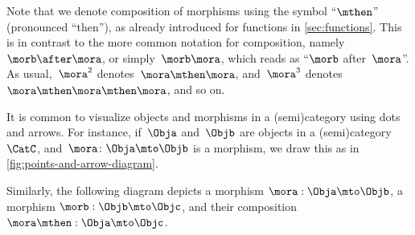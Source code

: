 \begin{remark}
	Note that we denote composition of morphisms using the symbol ``$\mthen$'' (pronounced ``then''), as already introduced for functions in \cref{sec:functions}.
	This is in contrast to the more common notation for composition, namely~$\morb\after \mora$, or simply~$\morb \mora$, which reads as ``$\morb$ after~$\mora$''.
	As usual,~$\mora^2$ denotes~$\mora \mthen \mora$, and~$\mora^3$ denotes~$\mora \mthen \mora \mthen \mora$, and so on.
\end{remark}

\begin{remark}
	It is common to visualize objects and morphisms in a (semi)category using dots and arrows.
	For instance, if~$\Obja$ and~$\Objb$ are objects in a (semi)category~$\CatC$, and~$\mora\colon \Obja \mto \Objb$ is a morphism, we draw this as in \cref{fig:points-and-arrow-diagram}.
	\begin{marginfigure}
		\label{fig:points-and-arrow-diagram}
		\begin{center}
		\end{center}
	\end{marginfigure}

	Similarly, the following diagram depicts a morphism $\mora: \Obja \mto \Objb$, a morphism $\morb: \Objb \mto \Objc$, and their composition $\mora \mthen: \Obja \mto \Objc$.


\end{remark}

